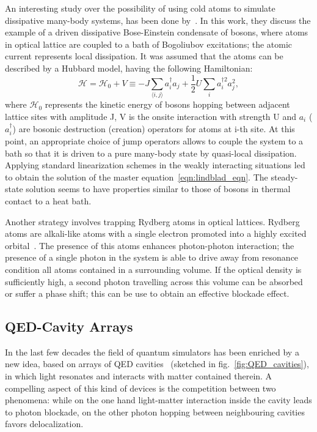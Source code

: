 An interesting study over the possibility of using cold atoms to simulate dissipative many-body systems, has been done by~\cite{BEC_dissipativeMBsimulator}. In this work, they discuss the example of a driven dissipative Bose-Einstein condensate of bosons, where atoms in optical lattice are coupled to a bath of Bogoliubov excitations; the atomic current represents local dissipation. It was assumed that the atoms can be described by a Hubbard model, having the following Hamiltonian:
\begin{equation}
    \mathcal{H} = \mathcal{H}_0 + V \equiv -J \sum_{\langle i,j \rangle} a_i^{\dagger} a_j + \frac{1}{2}U \sum_i a_i^{\dagger 2} a_j^2,
\end{equation}
where $\mathcal{H}_0$ represents the kinetic energy of bosons hopping between
adjacent lattice sites with amplitude J, V is the onsite interaction
with strength U and $a_i$ ($a_i^{\dagger}$) are bosonic destruction (creation)
operators for atoms at i-th site. At this point, an appropriate choice of jump operators allows to couple the system to a bath so that it is driven to a pure many-body state by quasi-local dissipation. Applying standard linearization schemes in the weakly interacting situations led to obtain the solution of the master equation~\ref{eqn:lindblad_eqn}. The steady-state solution seems to have properties similar to those of bosons in thermal contact to a heat bath.

Another strategy involves trapping Rydberg atoms in optical lattices. Rydberg atoms are alkali-like atoms with a single electron promoted into a highly excited orbital~\cite{carusotto_ciuti}. The presence of this atoms enhances photon-photon interaction; the presence of a single photon in the system is able to drive away from resonance condition all atoms contained in a surrounding volume. If the optical density is sufficiently high, a second photon travelling across this volume can be absorbed or suffer a phase shift; this can be use to obtain an effective blockade effect.

\subsection{QED-Cavity Arrays}
In the last few decades the field of quantum simulators has been enriched by a new idea, based on arrays of QED cavities~\cite{Tomadin_Fazio} (sketched in fig.~\ref{fig:QED_cavities}), in which light resonates and interacts with matter contained therein.  A compelling aspect of this kind of devices is the competition between two phenomena: while on the one hand light-matter interaction inside the cavity leads to photon blockade, on the other photon hopping between neighbouring cavities favors delocalization.

